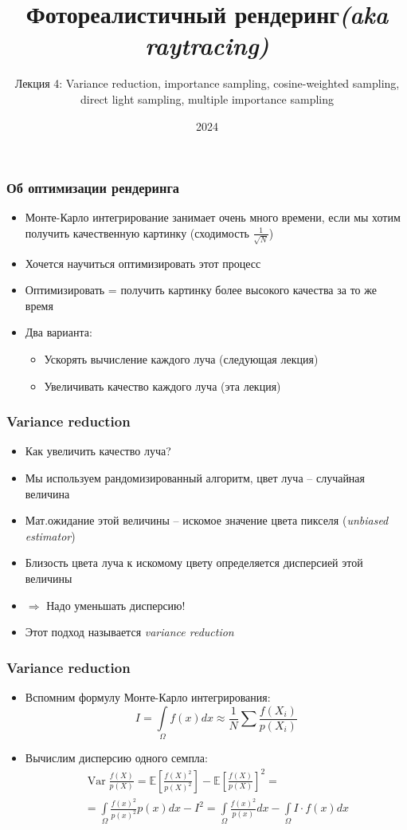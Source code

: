 \documentclass[10pt]{beamer}
\title{Фотореалистичный рендеринг\quad\quad\quad\quad\quad\quad \textit{(aka raytracing)}}
\subtitle{Лекция 4: Variance reduction, importance sampling, cosine-weighted sampling, direct light sampling, multiple importance sampling}
\date{2024}
\begin{document}
\frame{\titlepage}

\begin{frame}
\frametitle{Об оптимизации рендеринга}
\begin{itemize}
\item Монте-Карло интегрирование занимает очень много времени, если мы хотим получить качественную картинку (сходимость \(\frac{1}{\sqrt N}\))
\pause
\item Хочется научиться оптимизировать этот процесс
\pause
\item Оптимизировать = получить картинку более высокого качества за то же время
\pause
\item Два варианта:
\pause
\begin{itemize}
\item Ускорять вычисление каждого луча (следующая лекция)
\pause
\item Увеличивать качество каждого луча (эта лекция)
\end{itemize}
\end{itemize}
\end{frame}

\begin{frame}
\frametitle{Variance reduction}
\begin{itemize}
\item Как увеличить качество луча?
\pause
\item Мы используем рандомизированный алгоритм, цвет луча -- случайная величина
\pause
\item Мат.ожидание этой величины -- искомое значение цвета пикселя (\textit{unbiased estimator})
\pause
\item Близость цвета луча к искомому цвету определяется дисперсией этой величины
\pause
\item \begin{math}\Longrightarrow\end{math} Надо уменьшать дисперсию!
\pause
\item Этот подход называется \textit{variance reduction}
\end{itemize}
\end{frame}

\begin{frame}
\frametitle{Variance reduction}
\begin{itemize}
\item Вспомним формулу Монте-Карло интегрирования:
\begin{equation*}
I = \int\limits_\Omega f(x)dx \approx \frac{1}{N} \sum \frac{f(X_i)}{p(X_i)}
\end{equation*}
\pause
\item Вычислим дисперсию одного семпла:
\begin{gather*}
\operatorname{Var}\frac{f(X)}{p(X)} = \mathbb{E}\left[\frac{f(X)^2}{p(X)^2}\right] - \mathbb{E}\left[\frac{f(X)}{p(X)}\right]^2 = \\
= \int\limits_\Omega \frac{f(x)^2}{p(x)^2}p(x)dx - I^2 = \int\limits_\Omega \frac{f(x)^2}{p(x)}dx - \int\limits_\Omega I\cdot f(x)dx
\end{gather*}
\end{itemize}
\end{frame}
\end{document}
